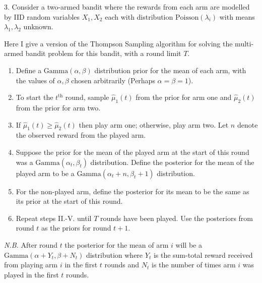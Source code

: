 \documentclass[11pt,a4paper]{article}
\begin{document}
\begin{answer}{3.}
  Consider a two-armed bandit where the rewards from each arm are modelled by IID random variables $X_1,X_2$ each with distribution $\text{Poisson}(\lambda_i)$ with means $\lambda_1,\lambda_2$ unknown.
  \par Here I give a version of the Thompson Sampling algorithm for solving the multi-armed bandit problem for this bandit, with a round limit $T$.
  \renewcommand{\theenumi}{\Roman{enumi}}
  \begin{enumerate}
    \item Define a $\text{Gamma}(\alpha,\beta)$ distribution prior for the mean of each arm, with the values of $\alpha,\beta$ chosen arbitrarily (Perhaps $\alpha=\beta=1$).
    \item To start the $t^\text{th}$ round, sample $\hat\mu_1(t)$ from the prior for arm one and $\hat\mu_2(t)$ from the prior for arm two.
    \item If $\hat\mu_1(t)\geq\hat\mu_2(t)$ then play arm one; otherwise, play arm two. Let $n$ denote the observed reward from the played arm.
    \item Suppose the prior for the mean of the played arm at the start of this round was a $\text{Gamma}(\alpha_t,\beta_t)$ distribution. Define the posterior for the mean of the played arm to be a $\text{Gamma}(\alpha_t+n,\beta_t+1)$ distribution.
    \item For the non-played arm, define the posterior for its mean to be the same as its prior at the start of this round.
    \item Repeat steps II.-V. until $T$ rounds have been played. Use the posteriors from round $t$ as the priors for round $t+1$.
  \end{enumerate}
  \textit{N.B.} After round $t$ the posterior for the mean of arm $i$ will be a $\text{Gamma}(\alpha+Y_t,\beta+N_t)$ distribution where $Y_t$ is the sum-total reward received from playing arm $i$ in the first $t$ rounds and $N_t$ is the number of times arm $i$ was played in the first $t$ rounds.
\end{answer}
\end{document}
